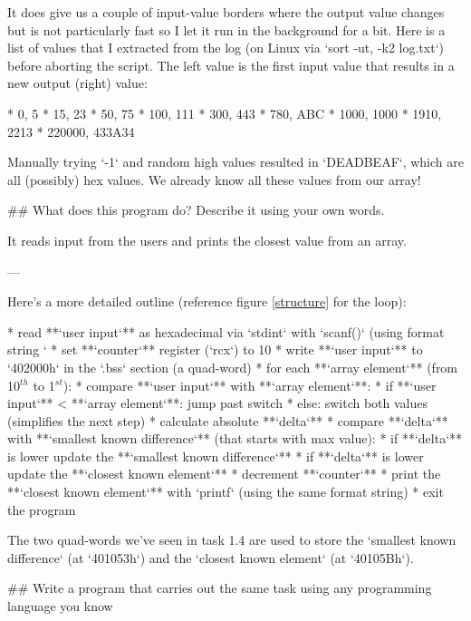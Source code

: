 \begin{markdown}

It does give us a couple of input-value borders where the output value changes but is not particularly fast so I let it run in the background for a bit.
\n
Here is a list of values that I extracted from the log (on Linux via `sort -ut, -k2 log.txt`) before aborting the script. The left value is the first input value that results in a new output (right) value: \n

* 0,  5
* 15,  23
* 50,  75
* 100,  111
* 300,  443
* 780,  ABC
* 1000,  1000
* 1910,  2213
* 220000,  433A34

\noindent\s
Manually trying `-1` and random high values resulted in `DEADBEAF`, which are all (possibly) hex values. We already know all these values from our array!

\clearpage
## What does this program do? Describe it using your own words.

It reads input from the users and prints the closest value from an array.

---

\noindent Here's a more detailed outline (reference figure \ref{structure} for the loop):\s

* read **`user input`** as hexadecimal via `stdint` with `scanf()` (using format string `%
* set **`counter`** register (`rcx`) to 10
* write **`user input`** to `402000h` in the `.bss` section (a quad-word)
* for each **`array element`** (from 10$^{th}$ to 1$^{st}$):
    * compare **`user input`** with **`array element`**:
        * if **`user input`** < **`array element`**: jump past switch
        * else: switch both values (simplifies the next step)
    * calculate absolute **`delta`**
    * compare **`delta`** with **`smallest known difference`** (that starts with max value):
        * if **`delta`** is lower update the **`smallest known difference`**
        * if **`delta`** is lower update the **`closest known element`**
    * decrement **`counter`**
* print the **`closest known element`** with `printf` (using the same format string)
* exit the program

\noindent\s The two quad-words we've seen in task 1.4 are used to store the `smallest known difference` (at `401053h`) and the `closest known element` (at `40105Bh`).

\clearpage
## Write a program that carries out the same task using any programming language you know
\end{markdown}
